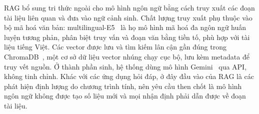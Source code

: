 RAG bổ sung tri thức ngoài cho mô hình ngôn ngữ bằng cách truy xuất các đoạn tài liệu liên quan và đưa vào ngữ cảnh sinh. Chất lượng truy xuất phụ thuộc vào bộ mã hoá văn bản: multilingual-E5~\citep{e5} là họ mô hình mã hoá đa ngôn ngữ huấn luyện tương phản, phân biệt truy vấn và đoạn văn bằng tiền tố, phù hợp với tài liệu tiếng Việt. Các vector được lưu và tìm kiếm lân cận gần đúng trong ChromaDB~\citep{chroma}, một cơ sở dữ liệu vector nhúng chạy cục bộ, lưu kèm metadata để truy vết nguồn. Ở thành phần sinh, hệ thống dùng mô hình Gemini~\citep{gemini2023,geminidocs} qua API, không tinh chỉnh. Khác với các ứng dụng hỏi đáp, ở đây đầu vào của RAG là các phát hiện định lượng do chương trình tính, nên yêu cầu then chốt là mô hình ngôn ngữ không được tạo số liệu mới và mọi nhận định phải dẫn được về đoạn tài liệu.

